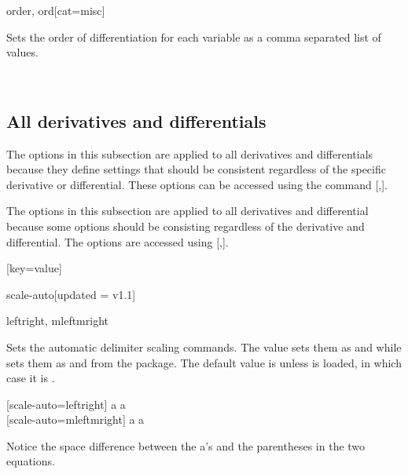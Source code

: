 \begin{option}{order, ord}[cat=misc]
	\begin{values}[default = 1]
	\end{values}
	Sets the order of differentiation for each variable as a comma separated list of values.
	\begin{example}
		 \\
	\end{example}
\end{option}

\subsection{All derivatives and differentials} \label{ssec:both_options}
The options in this subsection are applied to all derivatives and differentials because they define settings that should be consistent regardless of the specific derivative or differential. These options can be accessed using the command \macro{\derivset}[,].

The options in this subsection are applied to all derivatives and differential because some options should be consisting regardless of the derivative and differential. The options are accessed using \macro{\derivset}[,].
\begin{example}[result=false]
	[key=value]
\end{example}

\begin{option}{scale-auto}[updated = v1.1]
	\begin{values}[default = {leftright or mleftmright\req}]
		leftright, mleftmright\req
	\end{values}
	Sets the automatic delimiter scaling commands. The value  sets them as  and  while  sets them as  and  from the  package. The default value is  unless  is loaded, in which case it is .
	\begin{example}
		[scale-auto=leftright] a  a\\
		[scale-auto=mleftmright] a  a
	\end{example}
	Notice the space difference between the a's and the parentheses in the two equations.
\end{option}

